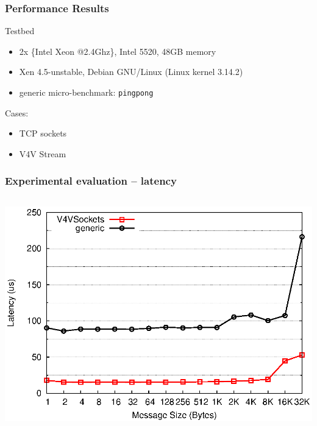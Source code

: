 \documentclass[red,slidestop,notes,compress,mathserif]{beamer}
\begin{document}
\begin{frame}
\frametitle{Performance Results}
\begin{block}{Testbed}
\begin{itemize}
\item 2x \{Intel Xeon @2.4Ghz\}, Intel 5520, 48GB memory
\item Xen 4.5-unstable, Debian GNU/Linux (Linux kernel 3.14.2)
\item generic micro-benchmark: \texttt{pingpong}
\end{itemize}
\end{block}
{Cases:}
\begin{itemize}
\item TCP sockets
\item V4V Stream
\end{itemize}
\end{frame}


\begin{frame}
\frametitle{Experimental evaluation -- latency}
\begin{columns}
\includegraphics[width=\textwidth]{figures/v4v_lat.eps}
\end{columns}
\end{frame}
\end{document}

